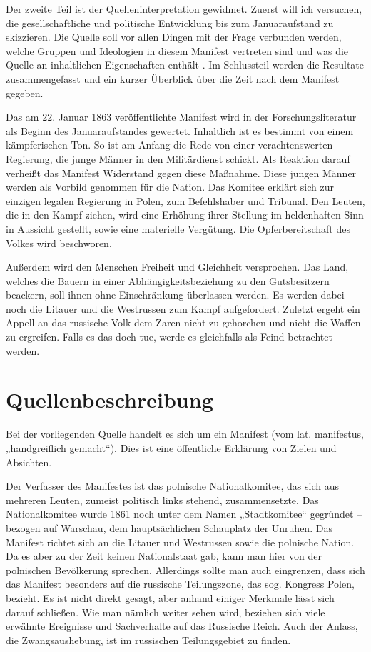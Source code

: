 \documentclass{../../sem_paper}
\begin{document}
Der zweite Teil ist der Quelleninterpretation gewidmet. Zuerst will ich versuchen, die
gesellschaftliche und politische Entwicklung bis zum Januaraufstand zu skizzieren. Die Quelle soll
vor allen Dingen mit der Frage verbunden werden, welche Gruppen und Ideologien in diesem
Manifest vertreten sind und was die Quelle an inhaltlichen Eigenschaften enthält .
Im Schlussteil werden die Resultate zusammengefasst und ein kurzer Überblick über die Zeit nach
dem Manifest gegeben.

Das am 22. Januar 1863 veröffentlichte Manifest wird in der Forschungsliteratur als Beginn des
Januaraufstandes gewertet. Inhaltlich ist es bestimmt von einem kämpferischen Ton. So ist am
Anfang die Rede von einer verachtenswerten Regierung, die junge Männer in den Militärdienst
schickt. Als Reaktion darauf verheißt das Manifest Widerstand gegen diese Maßnahme. Diese
jungen Männer werden als Vorbild genommen für die Nation. Das Komitee erklärt sich zur einzigen
legalen Regierung in Polen, zum Befehlshaber und Tribunal. Den Leuten, die in den Kampf ziehen,
wird eine Erhöhung ihrer Stellung im heldenhaften Sinn in Aussicht gestellt, sowie eine materielle
Vergütung. Die Opferbereitschaft des Volkes wird beschworen.

Außerdem wird den Menschen Freiheit und Gleichheit versprochen. Das Land, welches die Bauern
in einer Abhängigkeitsbeziehung zu den Gutsbesitzern beackern, soll ihnen ohne Einschränkung
überlassen werden. Es werden dabei noch die Litauer und die Westrussen zum Kampf aufgefordert.
Zuletzt ergeht ein Appell an das russische Volk dem Zaren nicht zu gehorchen und nicht die Waffen
zu ergreifen. Falls es das doch tue, werde es gleichfalls als Feind betrachtet werden.

\section{Quellenbeschreibung}
Bei der vorliegenden Quelle handelt es sich um ein Manifest (vom lat. manifestus, „handgreiflich
gemacht“). Dies ist eine öffentliche Erklärung von Zielen und Absichten.

Der Verfasser des Manifestes ist das polnische Nationalkomitee, das sich aus mehreren Leuten,
zumeist politisch links stehend, zusammensetzte. Das Nationalkomitee wurde 1861 noch unter dem
Namen „Stadtkomitee“ gegründet – bezogen auf Warschau, dem hauptsächlichen Schauplatz der
Unruhen. Das Manifest richtet sich an die Litauer und Westrussen sowie die polnische Nation. Da
es aber zu der Zeit keinen Nationalstaat gab, kann man hier von der polnischen Bevölkerung
sprechen. Allerdings sollte man auch eingrenzen, dass sich das Manifest besonders auf die russische
Teilungszone, das sog. Kongress Polen, bezieht. Es ist nicht direkt gesagt, aber anhand einiger
Merkmale lässt sich darauf schließen. Wie man nämlich weiter sehen wird, beziehen sich viele
erwähnte Ereignisse und Sachverhalte auf das Russische Reich. Auch der Anlass, die
Zwangsaushebung, ist im russischen Teilungsgebiet zu finden.
\end{document}
